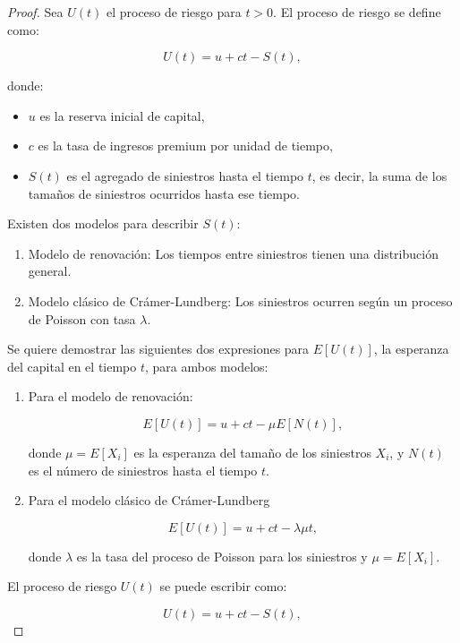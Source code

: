 \documentclass[
  us-letterpaper,
]{scrreprt}
\theoremstyle{plain}
\theoremstyle{plain}
\theoremstyle{definition}
\theoremstyle{remark}
\begin{document}
\begin{proof}
Sea \(U(t)\) el proceso de riesgo para \(t>0\). El proceso de riesgo se
define como:

\[
U(t) = u + ct -S(t),
\]

donde:

\begin{itemize}
\item
  \(u\) es la reserva inicial de capital,
\item
  \(c\) es la tasa de ingresos premium por unidad de tiempo,
\item
  \(S(t)\) es el agregado de siniestros hasta el tiempo \(t\), es decir,
  la suma de los tamaños de siniestros ocurridos hasta ese tiempo.
\end{itemize}

Existen dos modelos para describir \(S(t)\):

\begin{enumerate}
\def\labelenumi{\arabic{enumi}.}
\item
  Modelo de renovación: Los tiempos entre siniestros tienen una
  distribución general.
\item
  Modelo clásico de Crámer-Lundberg: Los siniestros ocurren según un
  proceso de Poisson con tasa \(\lambda\).
\end{enumerate}

Se quiere demostrar las siguientes dos expresiones para \(E[U(t)]\), la
esperanza del capital en el tiempo \(t\), para ambos modelos:

\begin{enumerate}
\def\labelenumi{\arabic{enumi}.}
\item
  Para el modelo de renovación:

  \[
  E[U(t)] = u + ct - \mu E[N(t)],
  \]

  donde \(\mu = E[X_i]\) es la esperanza del tamaño de los siniestros
  \(X_i\)\hspace{0pt}, y \(N(t)\) es el número de siniestros hasta el
  tiempo \(t\).
\item
  Para el modelo clásico de Crámer-Lundberg

  \[
  E[U(t)] = u + ct - \lambda \mu t,
  \]

  donde \(\lambda\) es la tasa del proceso de Poisson para los
  siniestros y \(\mu = E[X_i]\).
\end{enumerate}

El proceso de riesgo \(U(t)\) se puede escribir como:

\[U(t) = u + ct - S(t),\]


\end{proof}
\end{document}
